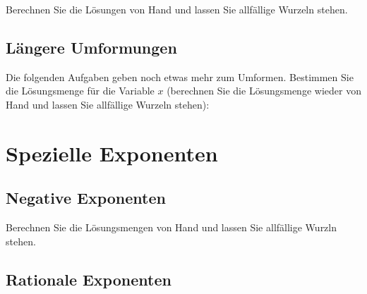 Berechnen Sie die Lösungen von Hand und lassen Sie allfällige Wurzeln
stehen.





\noTRAINER{\newpage}

\subsection{Längere Umformungen}
Die folgenden Aufgaben geben noch etwas mehr zum Umformen. Bestimmen
Sie die Lösungsmenge für die Variable $x$ (berechnen Sie die
Lösungsmenge wieder von Hand und lassen Sie allfällige Wurzeln stehen):




\newpage
\section{Spezielle Exponenten}
\subsection{Negative Exponenten}

Berechnen Sie die Lösungsmengen von Hand und lassen Sie allfällige
Wurzln stehen.


\noTRAINER{\newpage}
\subsection{Rationale Exponenten}




